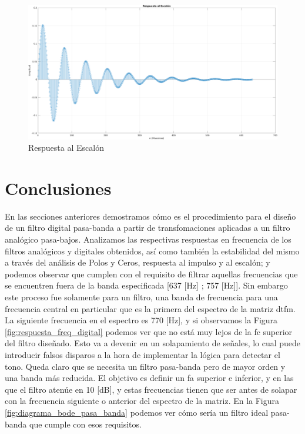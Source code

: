 \begin{figure}[H]
  \centering
  \includegraphics[width=\linewidth]{images/filtros-digitales/step.png}
  \caption{Respuesta al Escalón}
  \label{fig:step}
\end{figure}

\section{Conclusiones}
En las secciones anteriores demostramos cómo es el procedimiento para el diseño de un filtro digital pasa-banda a partir de transfomaciones aplicadas a un filtro analógico pasa-bajos. Analizamos las respectivas respuestas en frecuencia de los filtros analógicos y digitales obtenidos, así como también la estabilidad del mismo a través del análisis de Polos y Ceros, respuesta al impulso y al escalón; y podemos observar que cumplen con el requisito de filtrar aquellas frecuencias que se encuentren fuera de la banda especificada [637 [Hz] ; 757 [Hz]]. Sin embargo este proceso fue solamente para un filtro, una banda de frecuencia para una frecuencia central en particular que es la primera del espectro de la matriz \gls{dtfm}. La siguiente frecuencia en el espectro es 770 [Hz], y si observamos la Figura \ref{fig:respuesta_freq_digital} podemos ver que no está muy lejos de la \gls{fc} superior del filtro diseñado. Esto va a devenir en un solapamiento de señales, lo cual puede introducir falsos disparos a la hora de implementar la lógica para detectar el tono. Queda claro que se necesita un filtro pasa-banda pero de mayor orden y una banda más reducida. El objetivo es definir un \gls{fa} superior e inferior, y en las que el filtro atenúe en 10 [dB], y estas frecuencias tienen que ser antes de solapar con la frecuencia siguiente o anterior del espectro de la matriz. En la Figura \ref{fig:diagrama_bode_pasa_banda} podemos ver cómo sería un filtro ideal pasa-banda que cumple con esos requisitos.

